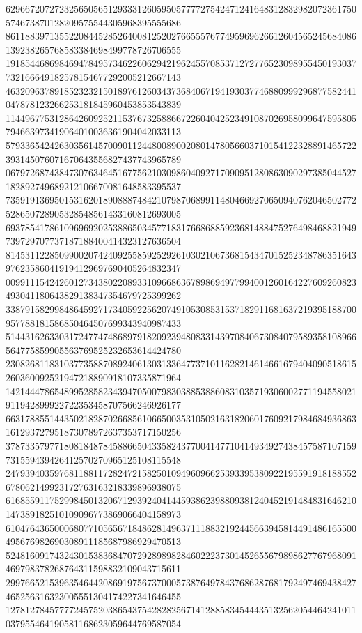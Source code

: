 \begin{DoxyCode}
      629667207272325650565129333126059505777727542471241648312832982072361750574673870128209575544305968395555686
      861188397135522084452852640081252027665557677495969626612604565245684086139238265768583384698499778726706555
      191854468698469478495734622606294219624557085371272776523098955450193037732166649182578154677292005212667143
      463209637891852323215018976126034373684067194193037746880999296877582441047878123266253181845960453853543839
      114496775312864260925211537673258866722604042523491087026958099647595805794663973419064010036361904042033113
      579336542426303561457009011244800890020801478056603710154122328891465722393145076071670643556827437743965789
      067972687438473076346451677562103098604092717090951280863090297385044527182892749689212106670081648583395537
      735919136950153162018908887484210798706899114804669270650940762046502772528650728905328548561433160812693005
      693785417861096969202538865034577183176686885923681488475276498468821949739729707737187188400414323127636504
      814531122850990020742409255859252926103021067368154347015252348786351643976235860419194129697690405264832347
      009911154242601273438022089331096686367898694977994001260164227609260823493041180643829138347354679725399262
      338791582998486459271734059225620749105308531537182911681637219395188700957788181586850464507699343940987433
      514431626330317247747486897918209239480833143970840673084079589358108966564775859905563769525232653614424780
      230826811831037735887089240613031336477371011628214614661679404090518615260360092521947218890918107335871964
      142144478654899528582343947050079830388538860831035719306002771194558021911942899922722353458707566246926177
      663178855144350218287026685610665003531050216318206017609217984684936863161293727951873078972637353717150256
      378733579771808184878458866504335824377004147710414934927438457587107159731559439426412570270965125108115548
      247939403597681188117282472158250109496096625393395380922195591918188552678062149923172763163218339896938075
      616855911752998450132067129392404144593862398809381240452191484831646210147389182510109096773869066404158973
      610476436500068077105656718486281496371118832192445663945814491486165500495676982690308911185687986929470513
      524816091743243015383684707292898982846022237301452655679898627767968091469798378268764311598832109043715611
      299766521539635464420869197567370005738764978437686287681792497469438427465256316323005551304174227341646455
      127812784577772457520386543754282825671412885834544435132562054464241011037955464190581168623059644769587054

\end{DoxyCode}
